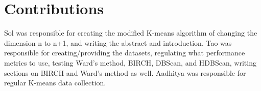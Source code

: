 \documentclass{aa}
\begin{document}
\section{Contributions}

Sol was responsible for creating the modified K-means algorithm of changing the dimension n to n+1, and writing the abstract and introduction. Tao was responsible for creating/providing the datasets, regulating what performance metrics to use, testing Ward’s method, BIRCH, DBScan, and HDBScan, writing sections on BIRCH and Ward’s method as well. Aadhitya was responsible for regular K-means data collection.

 



 



%
%
\end{document}
